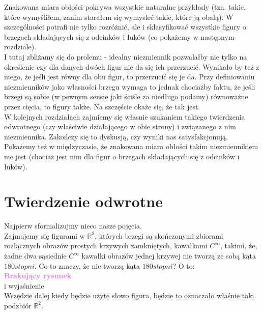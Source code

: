 \documentclass[a4paper, 12pt]{article}
\newcommand{\rysunek}[1]{\hfill \break\\[16pt] \Huge \textbf{\textcolor{violet}{Brakujący rysunek \normalsize
#1}} \hfill
\break \\[16pt] \normalsize}
\begin{document}
 Znakowana miara obłości pokrywa wszystkie naturalne przykłady (tzn. takie, które wymyśliłem, zanim starałem
 się wymysleć takie, które ją obalą). W szczególności potrafi nie tylko rozróżnić, ale i sklasyfikować
 wszystkie figury o brzegach składających się z odcinków i łuków (co pokażemy w następnym rozdziale). \\
 I tutaj zbliżamy się do prolemu - idealny niezmiennik pozwalałby nie tylko na określenie czy dla danych
 dwóch figur nie da się ich przerzucić. Wynikało by też z niego, że jeśli jest równy dla obu figur, to
 przerzucić się je da. Przy definiowaniu niezmienników jako własności brzegu wymaga to jednak chociażby
 faktu, że jeśli brzegi są sobie (w pewnym sensie jaki ściśle za niedługo podamy) równoważne przez cięcia,
 to figury także. Na szczęście okaże się, że tak jest. \\
 W kolejnych rozdziałach zajmiemy się własnie szukaniem takiego twierdzenia odwrotnego (czy właściwie
 działającego w obie strony) i związanego z nim niezmiennika. Zakończy się to dyskusją, czy wyniki nas
 satysfakcjonują. \\
 Pokażemy też w międzyczasie, że znakowana miara obłości takim niezmiennikiem nie jest (chociaż jest nim
 dla figur o brzegach składających się z odcinków i łuków).
\section{Twierdzenie odwrotne}
Najpierw sformalizujmy nieco nasze pojęcia. \\
Zajmujemy się figurami w $\mathbb{R}^2$, których brzegi są skończonymi zbiorami rozłącznych obrazów
prostych krzywych
zamkniętych, kawałkami $C^\infty$, takimi, że, żadne dwa sąsiednie $C^\infty$ kawałki obrazów jednej krzywej
nie tworzą ze sobą kąta $180 stopni$. Co to znaczy, że nie tworzą kąta $180 stopni$? O to:
\rysunek{}
i wyjaśnienie \\

Wszędzie dalej kiedy będzie użyte słowo figura, będzie to oznaczało właśnie taki podzbiór $\mathbb{R}^2$. \\
\end{document}
